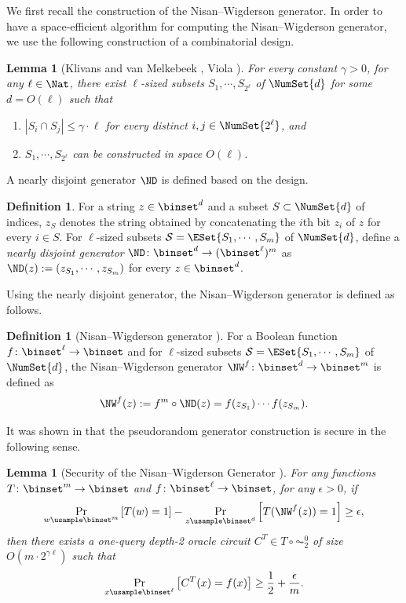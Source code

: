 \documentclass[11pt]{article}
\numberwithin{equation}{section}
\newtheorem{lemma}[theorem]{Lemma}
\theoremstyle{definition}
\newtheorem{definition}[theorem]{Definition}
\theoremstyle{plain}
\begin{document}
We first recall the construction of the Nisan--Wigderson generator.
In order to have
a space-efficient algorithm for computing the Nisan--Wigderson generator,
we use the following construction of a combinatorial design.
\begin{lemma}
  [Klivans and van Melkebeek \cite{KlivansM02_siamcomp_journals}, Viola \cite{Viola05_cc_journals}]
  \label{lemma_design}
  For every constant $\gamma > 0$, for any $\ell \in \Nat$,
  there exist $\ell$-sized subsets $S_1, \cdots, S_{2^\ell}$ of $\NumSet{d}$ for some $d = O(\ell)$
  such that
  \begin{enumerate}
    \item
          $|S_i \cap S_j| \le \gamma \cdot \ell$ for every distinct $i, j \in \NumSet{2^\ell}$, and
    \item
          $S_1, \cdots, S_{2^\ell}$ can be constructed in space $O(\ell)$.
  \end{enumerate}
\end{lemma}

A nearly disjoint generator $\ND$ is defined based on the design.
\begin{definition}
  \label{def_NDgenerator}
  For a string $z \in \binset^d$ and a subset $S \subset \NumSet{d}$ of indices,
  $z_S$ denotes the string obtained by concatenating the $i$th bit $z_i$ of $z$ for every $i \in S$.
  For $\ell$-sized subsets $\mathcal{S} = \ESet{S_1, \cdots, S_{m}}$ of $\NumSet{d}$, define
  a \emph{nearly disjoint generator} $\ND \colon \binset^d \to (\binset^\ell)^m$ as
  $\ND(z) := (z_{S_1}, \cdots, z_{S_m})$ for every $z \in \binset^d$.
\end{definition}
%

Using the nearly disjoint generator, the Nisan--Wigderson generator is defined as follows.
\begin{definition}
  [Nisan--Wigderson generator \cite{NisanW94_jcss_journals}]
  \label{def_NWgenerator}
  For a Boolean function $f \colon \binset^\ell \to \binset$ and
  for $\ell$-sized subsets $\mathcal{S} = \ESet{S_1, \cdots, S_{m}}$ of $\NumSet{d}$,
  the Nisan--Wigderson generator $\NW^f \colon \binset^d \to \binset^m$ is defined as
  $$\NW^f(z) := f^{m} \circ \ND (z) = f(z_{S_1}) \cdots f(z_{S_m}).$$
\end{definition}

It was shown in \cite{NisanW94_jcss_journals}
that the pseudorandom generator construction is secure in the following sense.

\begin{lemma}
  [Security of the Nisan--Wigderson Generator \cite{NisanW94_jcss_journals}]
  \label{lemma_SecurityOfNW}
  For any functions $T \colon \binset^m \to \binset$ and $f \colon \binset^\ell \to \binset$, for any $\epsilon > 0$,
  if
  $$
    \Pr_{w \usample \binset^m} \left[ T(w) = 1 \right] - \Pr_{z \usample \binset^d} \left[ T(\NW^f(z)) = 1 \right] \ge \epsilon,
  $$
  then
  there exists a one-query depth-2 oracle circuit $C^T \in T \circ \AC^0_2$ of size $O(m \cdot 2^{\gamma \ell})$
  such that
  $$
    \Pr_{x \usample \binset^\ell} \left[ C^T(x) = f(x) \right] \ge \frac{1}{2} + \frac{\epsilon}{m}.
  $$
\end{lemma}
\end{document}
